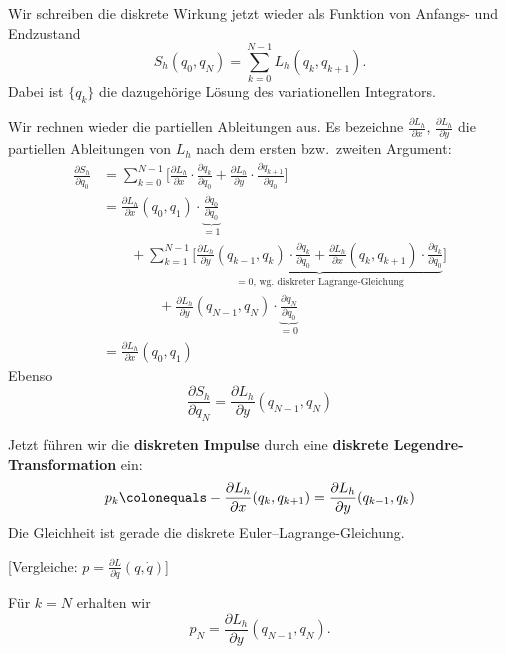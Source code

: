 Wir schreiben die diskrete Wirkung jetzt wieder als Funktion von Anfangs- und Endzustand
\begin{equation*}
	S_h(q_0, q_N) = \sum_{k=0}^{N-1} L_h (q_k, q_{k+1}).
\end{equation*}
Dabei ist $\{q_k\}$ die dazugehörige Lösung des variationellen Integrators.

Wir rechnen wieder die partiellen Ableitungen aus. Es bezeichne $\frac{\partial L_h}{\partial x}$, $\frac{\partial L_h}{\partial y}$ die partiellen Ableitungen von $L_h$ nach dem ersten bzw.\ zweiten Argument:
\begin{align*}
	\frac{\partial S_h}{\partial q_0}
	& = \sum_{k=0}^{N-1} \Bigg[ \frac{\partial L_h}{\partial x} \cdot\frac{\partial q_k}{\partial q_0} +  \frac{\partial L_h}{\partial y} \cdot\frac{\partial q_{k+1}}{\partial q_0}\Bigg] \\
	& = \frac{\partial L_h}{\partial x} (q_0,q_1)\cdot \underbrace{\frac{\partial q_0}{\partial q_0}}_{=1} \\
	& \qquad  + \sum_{k=1}^{N-1} \Bigg[ \underbrace{\frac{\partial L_h}{\partial y}(q_{k-1},q_k) \cdot\frac{\partial q_k}{\partial q_0} +  \frac{\partial L_h}{\partial x} (q_k,q_{k+1})\cdot\frac{\partial q_k}{\partial q_0}}_{\text{$=0$, wg.\ diskreter Lagrange-Gleichung}}\Bigg] \\
	& \qquad \qquad  + \frac{\partial L_h}{\partial y} (q_{N-1},q_N)\cdot \underbrace{\frac{\partial q_N}{\partial q_0}}_{=0} \\
	& = \frac{\partial L_h}{\partial x} (q_0, q_1)
\end{align*}
Ebenso 
\begin{equation*}
	\frac{\partial S_h}{\partial q_N}  = \frac{\partial L_h}{\partial y} (q_{N-1}, q_N)
\end{equation*}

Jetzt führen wir die \textbf{diskreten Impulse} durch eine \textbf{diskrete Legendre-Transformation} ein:
\begin{equation}
	\label{eq:diskrete_lagrange_transformation}
	p_k
	\colonequals
	- \frac{\partial L_h}{\partial x} (q_k, q_{k+1})
	= \frac{\partial L_h}{\partial y} (q_{k-1}, q_k)
\end{equation}
Die Gleichheit ist gerade die diskrete Euler--Lagrange-Gleichung.

[Vergleiche: $p = \frac{\partial L}{\partial \dot{q}}(q,\dot{q})$]

Für $k=N$ erhalten wir
\begin{equation*}
	p_N = \frac{\partial L_h}{\partial y} (q_{N-1}, q_N).
\end{equation*}

